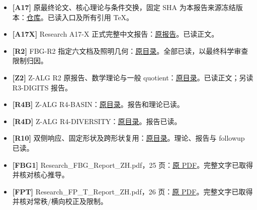 \documentclass[10pt,a4paper]{article}
\providecommand{\tightlist}{\setlength{\itemsep}{0pt}\setlength{\parskip}{0pt}}
\begin{document}
\begin{itemize}
\tightlist
\item
  \textbf{{[}A17{]}} 原最终论文、核心理论与条件交换，固定 SHA
  为本报告来源冻结版本：\href{https://github.com/migodam/a17-maxwell-certified-exchange/tree/2ac81b989a2f13d62df9d5a7abd690a33c2189c7/closure_final/manuscript}{仓库}。已读入口及所有引用
  TeX。
\item
  \textbf{{[}A17X{]}} Research A17-X
  正式完整中文报告：\href{https://github.com/migodam/b1-probabilistic-maxwell-imaging/blob/6659aa49dff2535996d40962791e9a5a6e974adc/research/a17x_f3_competition_audit/pro_source/report/RESEARCH_A17X_FULL_REPORT_ZH.md}{原报告}。已读正文。
\item
  \textbf{{[}R2{]}} FBG-R2
  指定六文档及照明几何：\href{https://github.com/migodam/b1-probabilistic-maxwell-imaging/tree/6659aa49dff2535996d40962791e9a5a6e974adc/research/research_fbg_r2_adaptive_feedback}{原目录}。全部已读，以最终科学审查限制归因。
\item
  \textbf{{[}Z2{]}} Z-ALG R2 原报告、数学理论与一般
  quotient：\href{https://github.com/migodam/b1-probabilistic-maxwell-imaging/tree/6659aa49dff2535996d40962791e9a5a6e974adc/research/research_z_alg_r2}{原目录}。已读正文；另读
  R3-DIGITS 报告。
\item
  \textbf{{[}R4B{]}} Z-ALG
  R4-BASIN：\href{https://github.com/migodam/b1-probabilistic-maxwell-imaging/tree/6659aa49dff2535996d40962791e9a5a6e974adc/research/research_z_alg_r4_basin}{原目录}。报告和理论已读。
\item
  \textbf{{[}R4D{]}} Z-ALG
  R4-DIVERSITY：\href{https://github.com/migodam/b1-probabilistic-maxwell-imaging/tree/6659aa49dff2535996d40962791e9a5a6e974adc/research/research_z_alg_r4_diversity}{原目录}。报告已读。
\item
  \textbf{{[}R10{]}}
  双侧响应、固定形状及跨形状复用：\href{https://github.com/migodam/b1-probabilistic-maxwell-imaging/tree/6659aa49dff2535996d40962791e9a5a6e974adc/research/p3l_r10_bilateral_structure}{原目录}。理论、报告与
  followup 已读。
\item
  \textbf{{[}FBG1{]}} Research\_FBG\_Report\_ZH.pdf，25
  页：\href{https://chatgpt.com/library?file_id=libfile_8e0adb443eb88191bbb6b2bd4eb7df0a\&account_id=0dc0cf97-6ec4-4161-b931-df57a5b8e476}{原
  PDF}。完整文字已取得并核对核心推导。
\item
  \textbf{{[}FPT{]}} Research\_FP\_T\_Report\_ZH.pdf，26
  页：\href{https://chatgpt.com/library?file_id=libfile_3964a0c7385481919601f972dd73acbb\&account_id=0dc0cf97-6ec4-4161-b931-df57a5b8e476}{原
  PDF}。完整文字已取得并核对常秩/横向校正及限制。
\end{itemize}
\end{document}

